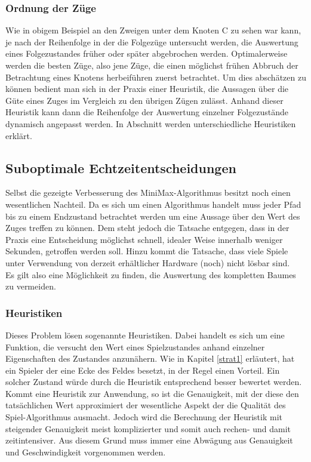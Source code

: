 \subsubsection{Ordnung der Züge}
Wie in obigem Beispiel an den Zweigen unter dem Knoten C zu sehen war kann, je nach der Reihenfolge in der die Folgezüge untersucht werden, die Auswertung eines Folgezustandes früher oder später abgebrochen werden. Optimalerweise werden die besten Züge, also jene Züge, die einen möglichst frühen Abbruch der Betrachtung eines Knotens herbeiführen zuerst betrachtet. Um dies abschätzen zu können bedient man sich in der Praxis einer Heuristik, die Aussagen über die Güte eines Zuges im Vergleich zu den übrigen Zügen zulässt. Anhand dieser Heuristik kann dann die Reihenfolge der Auswertung einzelner Folgezustände dynamisch angepasst werden. In Abschnitt  werden unterschiedliche Heuristiken erklärt.

\subsection{Suboptimale Echtzeitentscheidungen}
Selbst die gezeigte Verbesserung des MiniMax-Algorithmus besitzt noch einen wesentlichen Nachteil. Da es sich um einen  Algorithmus handelt muss jeder Pfad bis zu einem Endzustand betrachtet werden um eine Aussage über den Wert des Zuges treffen zu können. Dem steht jedoch die Tatsache entgegen, dass in der Praxis eine Entscheidung möglichst schnell, idealer Weise innerhalb weniger Sekunden, getroffen werden soll. Hinzu kommt die Tatsache, dass viele Spiele unter Verwendung von derzeit erhältlicher Hardware (noch) nicht lösbar sind.\\
Es gilt also eine Möglichkeit zu finden, die Auswertung des kompletten Baumes zu vermeiden.

\subsubsection{Heuristiken}
\label{Heuristiken}
Dieses Problem lösen sogenannte Heuristiken. Dabei handelt es sich um eine Funktion, die versucht den Wert eines Spielzustandes anhand einzelner Eigenschaften des Zustandes anzunähern. Wie in Kapitel \ref{strat1} erläutert, hat ein Spieler der eine Ecke des Feldes besetzt, in der Regel einen Vorteil. Ein solcher Zustand würde durch die Heuristik entsprechend besser bewertet werden.
\\Kommt eine Heuristik zur Anwendung, so ist die Genauigkeit, mit der diese den tatsächlichen Wert approximiert der wesentliche Aspekt der die Qualität des Spiel-Algorithmus ausmacht. Jedoch wird die Berechnung der Heuristik mit steigender Genauigkeit meist komplizierter und somit auch rechen- und damit zeitintensiver. Aus diesem Grund muss immer eine Abwägung aus Genauigkeit und Geschwindigkeit vorgenommen werden. 

